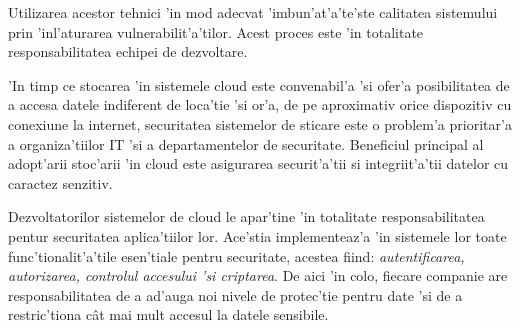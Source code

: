 \documentclass[12pt,a4paper,twoside]{report}
\begin{document}
Utilizarea acestor tehnici 'in mod adecvat 'imbun'at'a'te'ste calitatea sistemului prin 'inl'aturarea vulnerabilit'a'tilor. Acest proces este 'in totalitate responsabilitatea echipei de dezvoltare.

'In timp ce stocarea 'in sistemele cloud este convenabil'a 'si ofer'a posibilitatea de a accesa datele indiferent de loca'tie 'si or'a, de pe aproximativ orice dispozitiv cu conexiune la internet, securitatea sistemelor de sticare este o problem'a prioritar'a a organiza'tiilor IT 'si a departamentelor de securitate. Beneficiul principal al adopt'arii stoc'arii 'in cloud este asigurarea securit'a'tii si integriit'a'tii datelor cu caractez senzitiv.

Dezvoltatorilor sistemelor de cloud le apar'tine 'in totalitate responsabilitatea pentur securitatea aplica'tiilor lor. Ace'stia implementeaz'a 'in sistemele lor toate func'tionalit'a'tile esen'tiale pentru securitate, acestea fiind: \textit{autentificarea, autorizarea, controlul accesului 'si criptarea}. De aici 'in colo, fiecare companie are responsabilitatea de a ad'auga noi nivele de protec'tie pentru date 'si de a restric'tiona cât mai mult accesul la datele sensibile.
\end{document}
